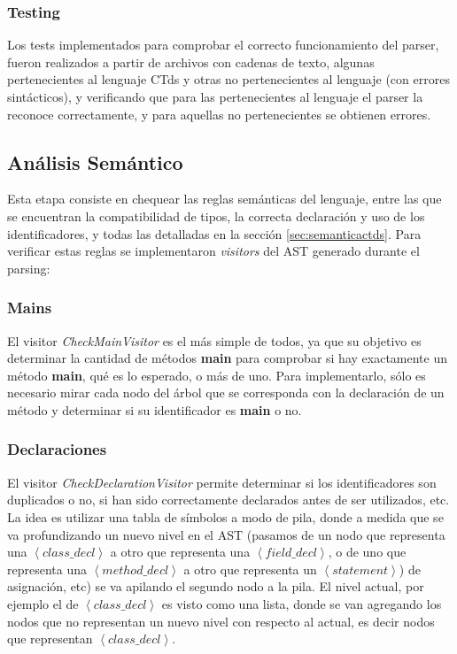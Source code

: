 \documentclass[11pt,a4paper]{article}
\begin{document}
\subsubsection{Testing}

Los tests implementados para comprobar el correcto funcionamiento del parser, fueron realizados a partir de archivos con cadenas de texto, algunas pertenecientes al lenguaje CTds y otras no pertenecientes al lenguaje (con errores sintácticos), y verificando que para las pertenecientes al lenguaje el parser la reconoce correctamente, y para aquellas no pertenecientes se obtienen errores. 

\subsection{Análisis Semántico} 
\label{subsec:semantico}

Esta etapa consiste en chequear las reglas semánticas del lenguaje, entre las que se encuentran la compatibilidad de tipos, la correcta declaración y uso de los identificadores, y todas las detalladas en la sección \ref{sec:semanticactds}. Para verificar estas reglas se implementaron \textit{visitors} del AST generado durante el parsing: 

\subsubsection{Mains}
\label{mains}
El visitor \textit{CheckMainVisitor} es el más simple de todos, ya que su objetivo es determinar la cantidad de métodos \textbf{main} para comprobar si hay exactamente un método \textbf{main}, qué es lo esperado, o más de uno. Para implementarlo, sólo es necesario mirar cada nodo del árbol que se corresponda con la declaración de un método y determinar si su identificador es \textbf{main} o no.
 
\subsubsection{Declaraciones}
\label{subsec:decls}

El visitor \textit{CheckDeclarationVisitor} permite determinar si los identificadores son duplicados o no, si han sido correctamente declarados antes de ser utilizados, etc. La idea es utilizar una tabla de símbolos a modo de pila, donde a medida que se va profundizando un nuevo nivel en el AST (pasamos de  un nodo que representa una $\left\langle class\_decl \right\rangle$ a otro que representa una $\left\langle field\_decl \right\rangle$, o de uno que representa una $\left\langle method\_decl \right\rangle$ a otro que representa un $\left\langle statement \right\rangle$) de asignación, etc) se va apilando el segundo nodo a la pila. El nivel actual, por ejemplo el de $\left\langle class\_decl \right\rangle$ es visto como una lista, donde se van agregando los nodos que no representan un nuevo nivel con respecto al actual, es decir nodos que representan $\left\langle class\_decl \right\rangle$. 
\end{document}
